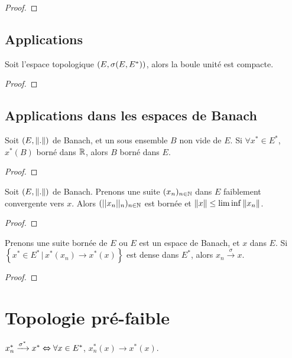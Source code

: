 \ifdefined\outputproof
\begin{proof}

\end{proof}
\fi

\subsection{Applications}

\begin{theorem}
	Soit l'espace topologique $(E, \sigma(E, E^{*}))$, alors la boule unité
	est compacte.
\end{theorem}

\ifdefined\outputproof
\begin{proof}

\end{proof}
\fi

\subsection{Applications dans les espaces de Banach}

\begin{proposition}
	Soit $(E, \norm{.})$ de Banach, et un sous ensemble $B$ non
	vide de $E$.
	Si $\forall x^{*} \in E^{*}$, $x^{*}(B)$ borné dans $\mathbb{R}$, alors $B$ borné
	dans $E$.
\end{proposition}

\ifdefined\outputproof
\begin{proof}

\end{proof}
\fi

\begin{corollary}
	Soit $(E, \norm{.})$ de Banach.
	Prenons une suite $(x_{n})_{n \in \mathbb{N}}$ dans $E$ faiblement
	convergente vers $x$.
	Alors $(||x_{n}||_{n})_{n \in \mathbb{N}}$ est bornée et $\norm{x} \leq
	\lim\inf \norm{x_{n}}$.
\end{corollary}

\ifdefined\outputproof
\begin{proof}

\end{proof}
\fi

\begin{proposition}
	Prenons une suite bornée de $E$ ou $E$ est un espace de Banach, et $x$ dans
	$E$.
	Si $\left\{ x^{*} \in E^{*} \, | \, x^{*}(x_{n}) \rightarrow x^{*}(x)
\right\}$ est dense dans $E^{*}$, alors $x_{n} \xrightarrow{\sigma} x$.
\end{proposition}

\ifdefined\outputproof
\begin{proof}

\end{proof}
\fi

\section{Topologie pré-faible}


\begin{proposition}
	$x^{*}_{n} \xrightarrow{\sigma^{*}} x^{*} \Leftrightarrow \forall x \in E^{*}$,
	$x^{*}_{n}(x) \rightarrow x^{*}(x)$.
\end{proposition}

